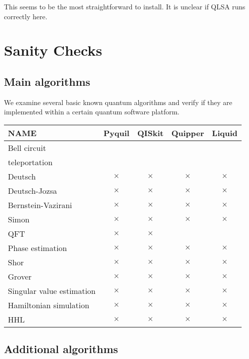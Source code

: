 \documentclass[12pt]{book}
\newcommand{\yup}{\checkmark}
\newcommand{\nup}{$\times$}
\begin{document}
This seems to be the most straightforward to install.
It is unclear if QLSA runs correctly here.



\chapter{Sanity Checks}


\section{Main algorithms}

We examine several basic known quantum algorithms and verify if they are implemented 
within a certain quantum software platform.

\bigskip

\begin{tabular}{|l||c|c|c|c||} \hline
NAME				& Pyquil& QISkit& Quipper& Liquid \\ \hline \hline
Bell circuit 		& \yup	& \yup	& \yup	& \yup \\ \hline
teleportation 		& \yup	& \yup	& \yup	& \yup \\ \hline
Deutsch	 			& \nup	& \nup	& \nup	& \nup \\ \hline
Deutsch-Jozsa		& \nup	& \nup	& \nup	& \nup \\ \hline
Bernstein-Vazirani	& \nup	& \nup	& \nup	& \nup \\ \hline
Simon				& \nup	& \nup	& \nup	& \nup \\ \hline
QFT					& \nup	& \nup	& \yup	& \yup \\ \hline
Phase estimation	& \nup	& \nup	& \nup	& \nup \\ \hline
Shor				& \nup	& \nup	& \nup	& \nup \\ \hline
Grover				& \nup	& \nup	& \nup	& \nup \\ \hline
Singular value estimation	& \nup	& \nup	& \nup	& \nup \\ \hline
Hamiltonian simulation	& \nup	& \nup	& \nup	& \nup \\ \hline
HHL					& \nup	& \nup	& \nup	& \nup \\ \hline
\end{tabular}

\bigskip


\section{Additional algorithms}
\end{document}
